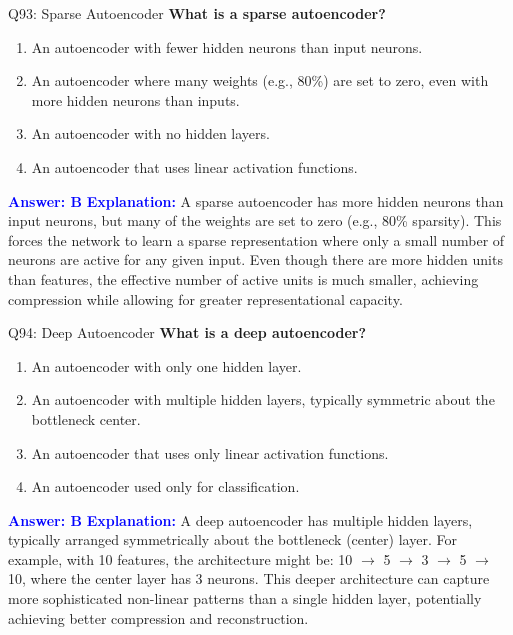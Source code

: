 \documentclass[8pt]{beamer}
\begin{document}
	\begin{frame}{Q93: Sparse Autoencoder}
		\fontsize{6.5}{7.5}\selectfont
		\textbf{What is a sparse autoencoder?}
		\begin{enumerate}
			\item An autoencoder with fewer hidden neurons than input neurons.
			\item An autoencoder where many weights (e.g., 80\%) are set to zero, even with more hidden neurons than inputs.
			\item An autoencoder with no hidden layers.
			\item An autoencoder that uses linear activation functions.
		\end{enumerate}
		\vspace{0.1cm}
		\textcolor{blue}{\textbf{Answer: B}}
		\vspace{0.1cm}
		\textcolor{blue}{\textbf{Explanation:}} A sparse autoencoder has more hidden neurons than input neurons, but many of the weights are set to zero (e.g., 80\% sparsity). This forces the network to learn a sparse representation where only a small number of neurons are active for any given input. Even though there are more hidden units than features, the effective number of active units is much smaller, achieving compression while allowing for greater representational capacity.
	\end{frame}
	
	\begin{frame}{Q94: Deep Autoencoder}
		\fontsize{6.5}{7.5}\selectfont
		\textbf{What is a deep autoencoder?}
		\begin{enumerate}
			\item An autoencoder with only one hidden layer.
			\item An autoencoder with multiple hidden layers, typically symmetric about the bottleneck center.
			\item An autoencoder that uses only linear activation functions.
			\item An autoencoder used only for classification.
		\end{enumerate}
		\vspace{0.1cm}
		\textcolor{blue}{\textbf{Answer: B}}
		\vspace{0.1cm}
		\textcolor{blue}{\textbf{Explanation:}} A deep autoencoder has multiple hidden layers, typically arranged symmetrically about the bottleneck (center) layer. For example, with 10 features, the architecture might be: 10 $\rightarrow$ 5 $\rightarrow$ 3 $\rightarrow$ 5 $\rightarrow$ 10, where the center layer has 3 neurons. This deeper architecture can capture more sophisticated non-linear patterns than a single hidden layer, potentially achieving better compression and reconstruction.
	\end{frame}
	
\end{document}
